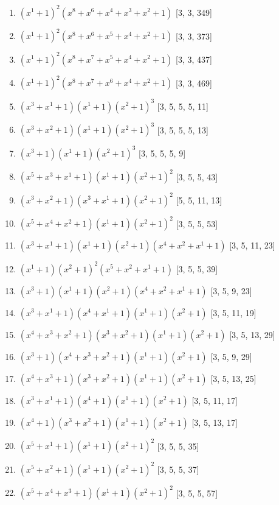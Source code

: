 \documentclass[10pt,twocolumn]{article}
\begin{document}
\begin{enumerate}
\item $(x^{1} + 1)^{2}(x^{8} + x^{6} + x^{4} + x^{3} + x^{2} + 1)$  [3, 3, 349]
\item $(x^{1} + 1)^{2}(x^{8} + x^{6} + x^{5} + x^{4} + x^{2} + 1)$  [3, 3, 373]
\item $(x^{1} + 1)^{2}(x^{8} + x^{7} + x^{5} + x^{4} + x^{2} + 1)$  [3, 3, 437]
\item $(x^{1} + 1)^{2}(x^{8} + x^{7} + x^{6} + x^{4} + x^{2} + 1)$  [3, 3, 469]
\item $(x^{3} + x^{1} + 1)(x^{1} + 1)(x^{2} + 1)^{3}$  [3, 5, 5, 5, 11]
\item $(x^{3} + x^{2} + 1)(x^{1} + 1)(x^{2} + 1)^{3}$  [3, 5, 5, 5, 13]
\item $(x^{3} + 1)(x^{1} + 1)(x^{2} + 1)^{3}$  [3, 5, 5, 5, 9]
\item $(x^{5} + x^{3} + x^{1} + 1)(x^{1} + 1)(x^{2} + 1)^{2}$  [3, 5, 5, 43]
\item $(x^{3} + x^{2} + 1)(x^{3} + x^{1} + 1)(x^{2} + 1)^{2}$  [5, 5, 11, 13]
\item $(x^{5} + x^{4} + x^{2} + 1)(x^{1} + 1)(x^{2} + 1)^{2}$  [3, 5, 5, 53]
\item $(x^{3} + x^{1} + 1)(x^{1} + 1)(x^{2} + 1)(x^{4} + x^{2} + x^{1} + 1)$  [3, 5, 11, 23]
\item $(x^{1} + 1)(x^{2} + 1)^{2}(x^{5} + x^{2} + x^{1} + 1)$  [3, 5, 5, 39]
\item $(x^{3} + 1)(x^{1} + 1)(x^{2} + 1)(x^{4} + x^{2} + x^{1} + 1)$  [3, 5, 9, 23]
\item $(x^{3} + x^{1} + 1)(x^{4} + x^{1} + 1)(x^{1} + 1)(x^{2} + 1)$  [3, 5, 11, 19]
\item $(x^{4} + x^{3} + x^{2} + 1)(x^{3} + x^{2} + 1)(x^{1} + 1)(x^{2} + 1)$  [3, 5, 13, 29]
\item $(x^{3} + 1)(x^{4} + x^{3} + x^{2} + 1)(x^{1} + 1)(x^{2} + 1)$  [3, 5, 9, 29]
\item $(x^{4} + x^{3} + 1)(x^{3} + x^{2} + 1)(x^{1} + 1)(x^{2} + 1)$  [3, 5, 13, 25]
\item $(x^{3} + x^{1} + 1)(x^{4} + 1)(x^{1} + 1)(x^{2} + 1)$  [3, 5, 11, 17]
\item $(x^{4} + 1)(x^{3} + x^{2} + 1)(x^{1} + 1)(x^{2} + 1)$  [3, 5, 13, 17]
\item $(x^{5} + x^{1} + 1)(x^{1} + 1)(x^{2} + 1)^{2}$  [3, 5, 5, 35]
\item $(x^{5} + x^{2} + 1)(x^{1} + 1)(x^{2} + 1)^{2}$  [3, 5, 5, 37]
\item $(x^{5} + x^{4} + x^{3} + 1)(x^{1} + 1)(x^{2} + 1)^{2}$  [3, 5, 5, 57]

\end{enumerate}
\end{document}

